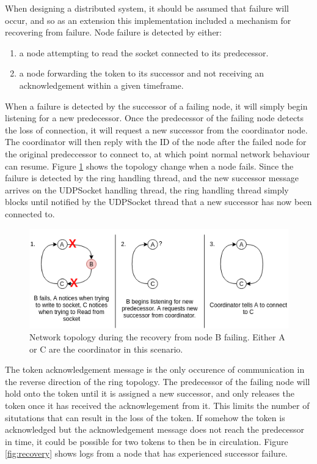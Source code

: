 \documentclass[12pt]{article}
\begin{document}
When designing a distributed system, it should be assumed that failure will occur, and so as an extension this implementation included a mechanism for recovering from failure. Node failure is detected by either:
\begin{enumerate}
	\item a node attempting to read the socket connected to its predecessor.
	\item a node forwarding the token to its successor and not receiving an acknowledgement within a given timeframe.
\end{enumerate}

When a failure is detected by the successor of a failing node, it will simply begin listening for a new predecessor. Once the predecessor of the failing node detects the loss of connection, it will request a new successor from the coordinator node. The coordinator will then reply with the ID of the node after the failed node for the original predeccessor to connect to, at which point normal network behaviour can resume. Figure \ref{fig:failure} shows the topology change when a node fails. Since the failure is detected by the ring handling thread, and the new successor message arrives on the UDPSocket handling thread, the ring handling thread simply blocks until notified by the UDPSocket thread that a new successor has now been connected to. 

\begin{figure}[!ht]
	\centering
	\includegraphics[width=\linewidth]{images/failure}
	\caption{Network topology during the recovery from node B failing. Either A or C are the coordinator in this scenario.}
	\label{fig:failure}
\end{figure}

The token acknowledgement message is the only occurence of communication in the reverse direction of the ring topology. The predecessor of the failing node will hold onto the token until it is assigned a new successor, and only releases the token once it has received the acknowlegement from it. This limits the number of situtations that can result in the loss of the token. If somehow the token is acknowledged but the acknowledgement message does not reach the predecessor in time, it could be possible for two tokens to then be in circulation. Figure \ref{fig:recovery} shows logs from a node that has experienced successor failure. 
\end{document}
